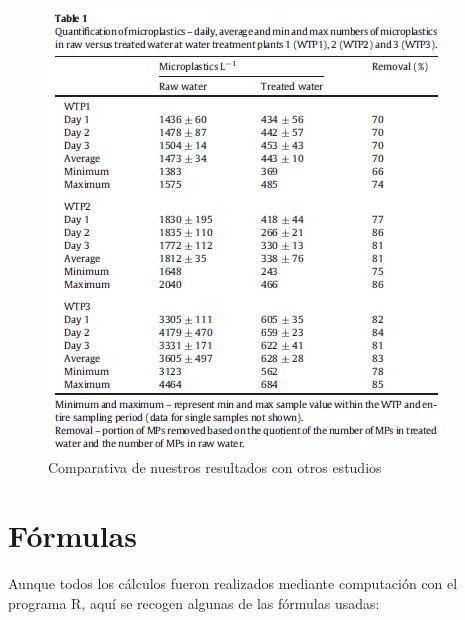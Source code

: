 \documentclass[a4paper,11pt]{article}
\begin{document}
	\begin{figure}[h]
	\centering
	\includegraphics[scale=0.5]{tabla3.png}
	\caption{Comparativa de nuestros resultados con otros estudios}
	\label{tabla3}
	
	\end{figure}

\section{Fórmulas}
	Aunque todos los cálculos fueron realizados mediante computación con el programa R, aquí se recogen algunas de las fórmulas usadas:
	
	
	
\end{document}
